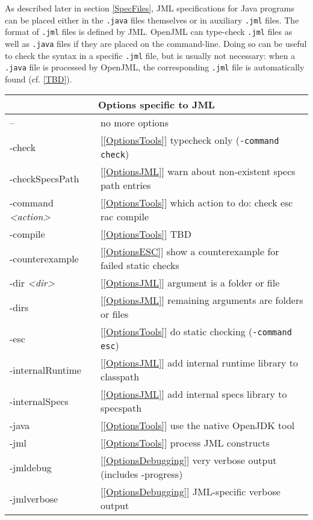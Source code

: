 As described later in section \ref{SpecFiles}, JML specifications for Java programs can be placed either in the 
{\tt .java} files themselves or in auxiliary {\tt .jml} files. The format
of {\tt .jml} files is defined by JML. OpenJML can type-check 
{\tt .jml} files as well as {\tt .java} files if they are placed on the 
command-line. Doing so can be useful to check the syntax in a specific
{\tt .jml} file, but is usually not necessary: when a {\tt .java} file is
processed by OpenJML, the corresponding {\tt .jml} file is automatically found (cf. \ref{TBD}).

\begin{table} \small
\parbox{.5\textwidth}{
\begin{tabular}{|l|p{1.4in}|}
\hline
\multicolumn{2}{|c|}{Options specific to JML} \\
\hline
-- & no more options \\ \hline
-check & [\ref{OptionsTools}] typecheck only ({\tt -command check})\\ \hline
-checkSpecsPath & [\ref{OptionsJML}] warn about non-existent specs path entries\\ \hline
-command {\it <action>}& [\ref{OptionsTools}] which action to do: check esc rac compile\\ \hline
-compile & [\ref{OptionsTools}] TBD\\ \hline
-counterexample & [\ref{OptionsESC}] show a counterexample for failed static checks\\ \hline
-dir {\it <dir>} & [\ref{OptionsJML}] argument is a folder or file \\ \hline
-dirs & [\ref{OptionsJML}] remaining arguments are folders or files\\ \hline
-esc & [\ref{OptionsTools}] do static checking ({\tt -command esc}) \\ \hline
-internalRuntime & [\ref{OptionsJML}] add internal runtime library to classpath \\ \hline
-internalSpecs & [\ref{OptionsJML}] add internal specs library to specspath \\ \hline
-java & [\ref{OptionsTools}] use the native OpenJDK tool\\ \hline
-jml & [\ref{OptionsTools}] process JML constructs \\ \hline
-jmldebug & [\ref{OptionsDebugging}] very verbose output (includes -progress) \\ \hline
-jmlverbose & [\ref{OptionsDebugging}] JML-specific verbose output\\ \hline

\end{tabular}}
\end{table}
